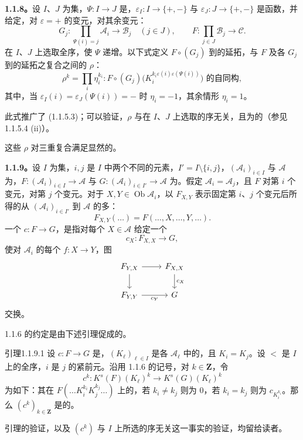 \textbf{1.1.8。}设 $I$、$J$ 为集，$\Psi:I\to J$ 是，$\varepsilon_I:I\to\{+,-\}$ 与 $\varepsilon_J:J\to\{+,-\}$ 是函数，并给定，对 $\varepsilon=+$ 的变元，对其余变元：
\[
G_j:\prod_{\Psi(i)=j}\mathcal A_i\longrightarrow\mathcal B_j\quad(j\in J),
\qquad F:\prod_{j\in J}\mathcal B_j\longrightarrow\mathcal C.
\]
在 $I$、$J$ 上选取全序，使 $\Psi$ 递增。以下式定义 $F\circ(G_j)$ 到的延拓，与 $F$ 及各 $G_j$ 到的延拓之复合之间的 $\rho$：
\[
\rho^k=\prod_i\eta_i^{k_i}:
F\circ(G_j)\bigl(K_i^{k_i\varepsilon(i)\varepsilon(\Psi(i))}\bigr)
\text{ 的自同构},\tag{1.1.8.1}
\]
其中，当 $\varepsilon_I(i)=\varepsilon_J(\Psi(i))=-$ 时 $\eta_i=-1$，其余情形 $\eta_i=1$。

此式推广了 (1.1.5.3)；可以验证，$\rho$ 与在 $I$、$J$ 上选取的序无关，且为的（参见 1.1.5.4 (ii)）。

这些 $\rho$ 对三重复合满足显然的。

\textbf{1.1.9。}设 $I$ 为集，$i,j$ 是 $I$ 中两个不同的元素，$I'=I\setminus\{i,j\}$，$(\mathcal A_i)_{i\in I}$ 与 $\mathcal A$ 为，$F:(\mathcal A_i)_{i\in I}\to\mathcal A$ 与 $G:(\mathcal A_i)_{i\in I'}\to\mathcal A$ 为。假定 $\mathcal A_i=\mathcal A_j$，且 $F$ 对第 $i$ 个变元，对第 $j$ 个变元。对于 $X,Y\in\operatorname{Ob}\mathcal A_i$，以 $F_{X,Y}$ 表示固定第 $i$、$j$ 个变元后所得的从 $(\mathcal A_i)_{i\in I'}$ 到 $\mathcal A$ 的多：
\[
F_{X,Y}(\dots)=F(\dots,X,\dots,Y,\dots).
\]
一个 $c:F\to G$，是指对每个 $X\in\mathcal A$ 给定一个
\[
c_X:F_{X,X}\longrightarrow G,
\]
使对 $\mathcal A_i$ 的每个 $f:X\to Y$，图
\[
\begin{tikzcd}
F_{Y,X}\arrow[r]\arrow[d]&F_{X,X}\arrow[d,"c_X"]\\
F_{Y,Y}\arrow[r,"c_Y"']&G
\end{tikzcd}
\]
交换。

1.1.6 的约定是由下述引理促成的。
\begin{SGAresult}{引理}{1.1.9.1}
设 $c:F\to G$ 是，$(K_\ell)_{\ell\in I}$ 是各 $\mathcal A_\ell$ 中的，且 $K_i=K_j$。设 $<$ 是 $I$ 上的全序，$i$ 是 $j$ 的紧前元。沿用 1.1.6 的记号，对 $k\in\mathbf Z$，令
\[
c^k:K^s(F)(K_\ell)^k\longrightarrow K^s(G)(K_\ell)^k
\]
为如下：其在 $F(\dots K_i^{k_i}K_j^{k_j}\dots)$ 上的，若 $k_i\ne k_j$ 则为 $0$，若 $k_i=k_j$ 则为 $c_{K_i^{k_i}}$。那么 $(c^k)_{k\in\mathbf Z}$ 是的。
\end{SGAresult}
引理的验证，以及 $(c^k)$ 与 $I$ 上所选的序无关这一事实的验证，均留给读者。


